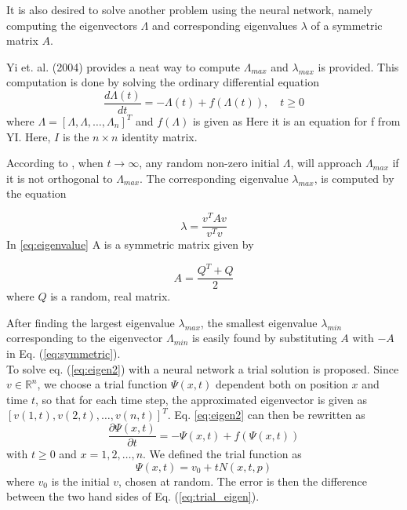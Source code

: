 \documentclass[a4paper,11pt,twocolumn]{article}
\begin{document}
It is also desired to solve another problem using the neural network, namely computing the eigenvectors $\Lambda$ and corresponding eigenvalues $\lambda$ of a symmetric matrix $A$.

Yi et. al. (2004) \cite{yi} provides a neat way to compute $\Lambda_{max}$ and $\lambda_{max}$ is provided. This computation is done by solving the ordinary differential equation
\begin{equation}
	\frac{d\Lambda(t)}{dt} = -\Lambda(t) + f(\Lambda(t)), \quad t\geq 0
	\label{eq:eigen2}
\end{equation}
 where $\Lambda = [\Lambda,\Lambda,\ldots,\Lambda_n]^T$ and $f(\Lambda)$ is given as
Here it is an equation for f from YI.
Here, $I$ is the $n\times n$ identity matrix. 

According to \cite{yi}, when $t\rightarrow \infty$, any random non-zero initial $\Lambda$, will approach $\Lambda_{max}$ if it is not orthogonal to $\Lambda_{max}$. The corresponding eigenvalue $\lambda_{max}$, is computed by the equation 

\begin{equation}
	\lambda = \frac{v^TAv}{v^Tv}
	\label{eq:eigenvalue}
\end{equation}
In \eqref{eq:eigenvalue} A is a symmetric matrix given by

\begin{equation}
	A = \frac{Q^T+Q }{2}
	\label{eq:symmetric}
\end{equation}
where $Q$ is a random, real matrix. 

After finding the largest eigenvalue $\lambda_{max}$, the smallest eigenvalue $\lambda_{min}$ corresponding to the eigenvector $\Lambda_{min}$ is easily found by substituting $A$ with $-A$ in Eq. (\ref{eq:symmetric})\cite{yi}.
\\

To solve eq. (\eqref{eq:eigen2}) with a neural network a trial solution is proposed. Since $v \in \mathbb{R}^n$, we choose a trial function $\Psi(x,t)$ dependent both on position $x$ and time $t$, so that for each time step, the approximated eigenvector is given as $[v(1,t), v(2,t), \ldots, v(n,t)]^T$. Eq. \ref{eq:eigen2} can then be rewritten as
\begin{equation}\label{eq:trial_eigen}
	\frac{\partial \Psi(x,t)}{\partial t} = -\Psi(x,t) + f(\Psi(x,t))
\end{equation}
with $t \geq 0$ and $x=1,2,\ldots,n$. We defined the trial function as 
\begin{equation*}
	 \Psi(x,t) = v_0 + tN(x,t,p)
\end{equation*}
where $v_0$ is the initial $v$, chosen at random.   
The error is then the difference between the two hand sides of Eq. (\ref{eq:trial_eigen}). 
\end{document}
